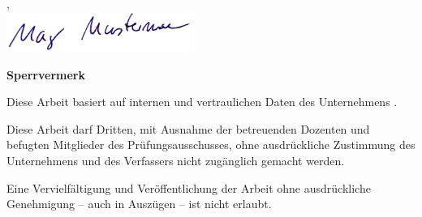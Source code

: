 \vspace{1cm}
\hsmaort, \hsmadatum \\

%
  {%
    \vspace{1.2cm}
  }%
  {%
    \includegraphics[width=6cm]{unterschrift.png}
  }%

\hsmaautor

%
{%
\vspace{11cm}
\color{red}\textsf{\large\textbf{Sperrvermerk}}

Diese Arbeit basiert auf internen und vertraulichen Daten des Unternehmens \hsmafirma.

Diese Arbeit darf Dritten, mit Ausnahme der betreuenden Dozenten und befugten Mitglieder des Prüfungsausschusses, ohne ausdrückliche Zustimmung des Unternehmens und des Verfassers nicht zugänglich gemacht werden.

Eine Vervielfältigung und Veröffentlichung der Arbeit ohne ausdrückliche Genehmigung -- auch in Auszügen -- ist nicht erlaubt.
\color{black}
}{}

\cleardoublepage



